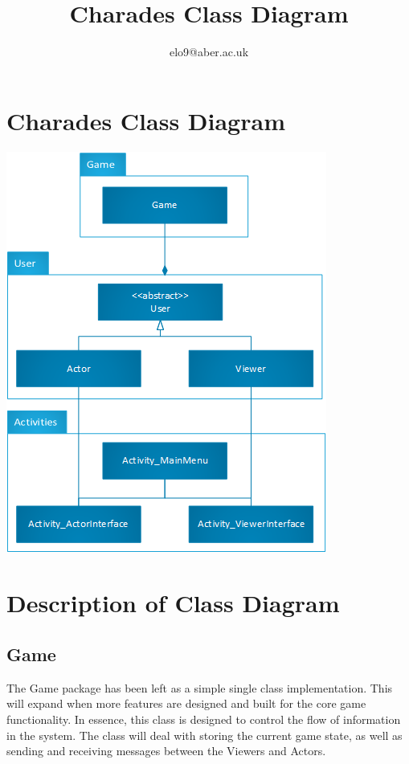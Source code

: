 \documentclass{article}
\title{Charades Class Diagram}
\author{elo9@aber.ac.uk}
\begin{document}
\maketitle
\tableofcontents

\newpage

\section{Charades Class Diagram}
\includegraphics[width=\textwidth]{CharadesClassImage}

\newpage


\section{Description of Class Diagram}
\subsection{Game}
The Game package has been left as a simple single class implementation. This will expand when more features are designed and built for the core game functionality. In essence, this class is designed to control the flow of information in the system. The class will deal with storing the current game state, as well as sending and receiving messages between the Viewers and Actors.
\end{document}

